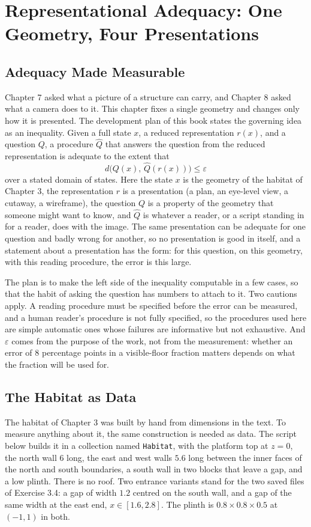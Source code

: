 \chapter{Representational Adequacy: One Geometry, Four Presentations}

\section{Adequacy Made Measurable}

Chapter 7 asked what a picture of a structure can carry, and Chapter 8 asked what a camera does to it. This chapter fixes a single geometry and changes only how it is presented. The development plan of this book states the governing idea as an inequality. Given a full state $x$, a reduced representation $r(x)$, and a question $Q$, a procedure $\widehat Q$ that answers the question from the reduced representation is adequate to the extent that
\[
  d\bigl(Q(x),\,\widehat Q(r(x))\bigr)\le\varepsilon
\]
over a stated domain of states. Here the state $x$ is the geometry of the habitat of Chapter 3, the representation $r$ is a presentation (a plan, an eye-level view, a cutaway, a wireframe), the question $Q$ is a property of the geometry that someone might want to know, and $\widehat Q$ is whatever a reader, or a script standing in for a reader, does with the image. The same presentation can be adequate for one question and badly wrong for another, so no presentation is good in itself, and a statement about a presentation has the form: for this question, on this geometry, with this reading procedure, the error is this large.

The plan is to make the left side of the inequality computable in a few cases, so that the habit of asking the question has numbers to attach to it. Two cautions apply. A reading procedure must be specified before the error can be measured, and a human reader's procedure is not fully specified, so the procedures used here are simple automatic ones whose failures are informative but not exhaustive. And $\varepsilon$ comes from the purpose of the work, not from the measurement: whether an error of $8$ percentage points in a visible-floor fraction matters depends on what the fraction will be used for.

\section{The Habitat as Data}

The habitat of Chapter 3 was built by hand from dimensions in the text. To measure anything about it, the same construction is needed as data. The script below builds it in a collection named \texttt{Habitat}, with the platform top at $z=0$, the north wall $6$ long, the east and west walls $5.6$ long between the inner faces of the north and south boundaries, a south wall in two blocks that leave a gap, and a low plinth. There is no roof. Two entrance variants stand for the two saved files of Exercise 3.4: a gap of width $1.2$ centred on the south wall, and a gap of the same width at the east end, $x\in[1.6,2.8]$. The plinth is $0.8\times0.8\times0.5$ at $(-1,1)$ in both.

